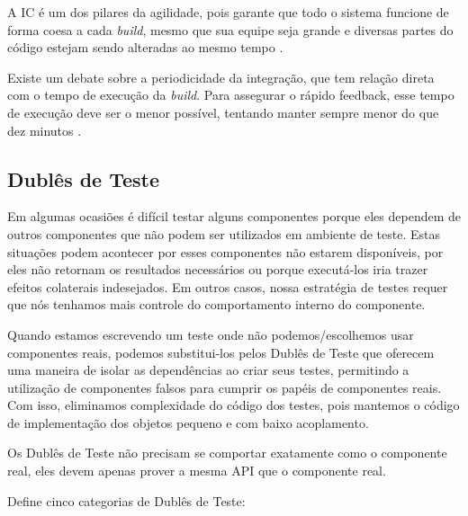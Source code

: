 A IC é um dos pilares da agilidade, pois garante que todo o sistema funcione de
forma coesa a cada \textit{build}, mesmo que sua equipe seja grande e diversas
partes do código estejam sendo alteradas ao mesmo tempo \cite{CaelumCI}.

Existe um debate sobre a periodicidade da integração, que tem relação direta com
o tempo de execução da \textit{build}. Para assegurar o rápido feedback, esse
tempo de execução deve ser o menor possível, tentando manter sempre menor do que
dez minutos \cite{FowlerCI}.



\subsection{Dublês de Teste}

Em algumas ocasiões é difícil testar alguns componentes porque eles dependem de
outros componentes que não podem ser utilizados em ambiente de teste. Estas
situações podem acontecer por esses componentes não estarem disponíveis, por
eles não retornam os resultados necessários ou porque executá-los iria trazer
efeitos colaterais indesejados. Em outros casos, nossa estratégia de testes
requer que nós tenhamos mais controle do comportamento interno do componente.

Quando estamos escrevendo um teste onde não podemos/escolhemos usar componentes
reais, podemos substitui-los pelos Dublês de Teste que oferecem uma maneira de
isolar as dependências ao criar seus testes, permitindo a utilização de
componentes falsos para cumprir os papéis de componentes reais. Com isso,
eliminamos complexidade do código dos testes, pois mantemos o código de
implementação dos objetos pequeno e com baixo acoplamento.

Os Dublês de Teste não precisam se comportar exatamente como o componente real,
eles devem apenas prover a mesma API que o componente real.

 Define cinco categorias de Dublês de Teste:

